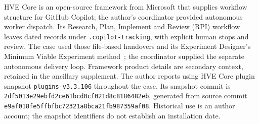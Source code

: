 HVE Core is an open-source framework from Microsoft that supplies workflow
structure for GitHub Copilot; the author's coordinator provided autonomous worker dispatch.
Its Research, Plan, Implement and Review (RPI) workflow leaves dated records
under \texttt{.copilot-tracking}, with explicit human stops and review.
The case used those file-based handovers and its Experiment Designer's Minimum
Viable Experiment method~\cite{hvecore}; the coordinator supplied the
separate autonomous delivery loop. Framework product details are secondary
context, retained in the ancillary supplement.
The author reports using HVE Core plugin snapshot \texttt{plugins-v3.3.106} throughout the
case. Its snapshot commit is
\texttt{2df5013e29ebfd2ce61bcd0cf021d8c8186482eb}, generated from source commit
\texttt{e9af018fe5ffbfbc72321a8bca21fb987359af08}. Historical use is an author account;
the snapshot identifiers do not establish an installation date.

